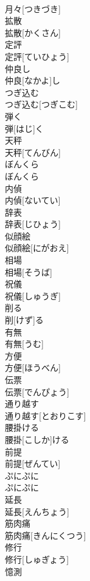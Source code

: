\documentclass[8pt]{extreport}
\begin{document}
\begin{CJK}{UTF8}{min}
\\	月々[つきづき]	
\\	拡散	
\\	拡散[かくさん]	
\\	定評	
\\	定評[ていひょう]	
\\	仲良し	
\\	仲良[なかよ]し	
\\	つぎ込む	
\\	つぎ込む[つぎこむ]	
\\	弾く	
\\	弾[はじ]く	
\\	天秤	
\\	天秤[てんびん]	
\\	ぼんくら	
\\	ぼんくら	
\\	内偵	
\\	内偵[ないてい]	
\\	辞表	
\\	辞表[じひょう]	
\\	似顔絵	
\\	似顔絵[にがおえ]	
\\	相場	
\\	相場[そうば]	
\\	祝儀	
\\	祝儀[しゅうぎ]	
\\	削る	
\\	削[けず]る	
\\	有無	
\\	有無[うむ]	
\\	方便	
\\	方便[ほうべん]	
\\	伝票	
\\	伝票[でんぴょう]	
\\	通り越す	
\\	通り越す[とおりこす]	
\\	腰掛ける	
\\	腰掛[こしか]ける	
\\	前提	
\\	前提[ぜんてい]	
\\	ぷにぷに	
\\	ぷにぷに	
\\	延長	
\\	延長[えんちょう]	
\\	筋肉痛	
\\	筋肉痛[きんにくつう]	
\\	修行	
\\	修行[しゅぎょう]	
\\	憶測	

\end{CJK}
\end{document}

